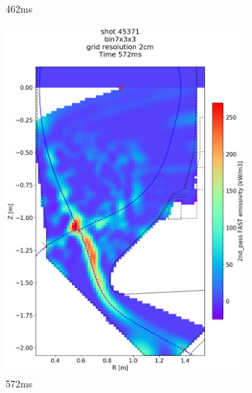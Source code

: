 \begin{figure}
\begin{subfigure}{0.395\linewidth}
         \vspace*{-6.5mm}
         \caption{462ms}
         \label{fig:45371_export2_1}
     \end{subfigure}
     \begin{subfigure}{0.395\linewidth}
         \centering
         \includegraphics[trim={75 40 0 190},clip,width=\textwidth]{Chapters/chapter2/figs/IRVB-MASTU_shot-45371_export_8.png}
         \vspace*{-6.5mm}
         \caption{572ms}
         \label{fig:45371_export2_2}
     \end{subfigure}
     \begin{subfigure}{0.395\linewidth}
         \centering

\end{subfigure}
\end{figure}
